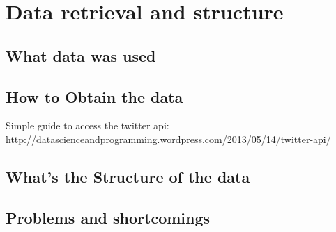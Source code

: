 \section{Data retrieval and structure}

\subsection{What data was used}
\subsection{How to Obtain the data}
Simple guide to access the twitter api:  http://datascienceandprogramming.wordpress.com/2013/05/14/twitter-api/

\subsection{What's the Structure of the data}
\subsection{Problems and shortcomings}
